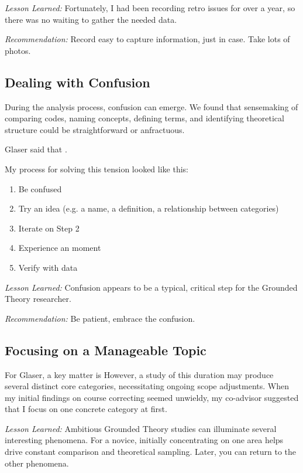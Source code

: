 \textit{Lesson Learned:} Fortunately, I had been recording retro issues for over a year, so there was no waiting to gather the needed data. 

\textit{Recommendation:} Record easy to capture information, just in case. Take lots of photos.
\subsection{Dealing with Confusion}
During the analysis process, confusion can emerge. We found that sensemaking of comparing codes, naming concepts, defining terms, and identifying theoretical structure could be straightforward or anfractuous.

Glaser said that  \cite{GlaserMillValleyWorkshop}. 

My process for solving this tension looked like this:

\begin{enumerate}
  \item Be confused
  \item Try an idea (e.g. a name, a definition, a relationship between categories)
  \item Iterate on Step 2
  \item Experience an  moment
  \item Verify with data
\end{enumerate}

\textit{Lesson Learned:} Confusion appears to be a typical, critical step for the Grounded Theory researcher.

\textit{Recommendation:} Be patient, embrace the confusion.
\subsection{Focusing on a Manageable Topic}
For Glaser, a key matter is  However, a study of this duration may produce several distinct core categories, necessitating ongoing scope adjustments. When my initial findings on course correcting seemed unwieldy, my co-advisor suggested that I focus on one concrete category at first. 

\textit{Lesson Learned:} Ambitious Grounded Theory studies can illuminate several interesting phenomena. For a novice, initially concentrating on one area helps drive constant comparison and theoretical sampling. Later, you can return to the other phenomena.

